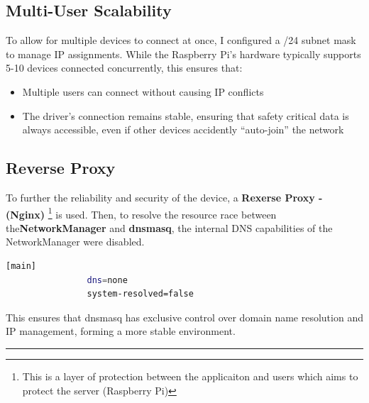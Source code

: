\subsection{Multi-User Scalability}
To allow for multiple devices to connect at once, I configured a /24 subnet mask to manage IP assignments. While the Raspberry Pi’s hardware
typically supports 5-10 devices connected concurrently, this ensures that:
\begin{itemize}
    \item Multiple users can connect without causing IP conflicts
    \item The driver’s connection remains stable, ensuring that safety critical data is always accessible, even if other devices accidently
    “auto-join” the network
\end{itemize}

\subsection{Reverse Proxy}
To further the reliability and security of the device, a \textbf{Rexerse Proxy - (Nginx)} \footnote{This is a layer of protection between the
applicaiton and users which aims to protect the server (Raspberry Pi)} is used.
Then, to resolve the resource race between the\textbf{NetworkManager} and \textbf{dnsmasq}, the internal DNS capabilities of the NetworkManager
were disabled.
\vspace{1em}
\begin{center} %
    \begin{minipage}{0.7\textwidth}
        \begin{mdframed}
            \begin{lstlisting}[language=bash, caption={NetworkManager.conf modifications for preventing inbuilt DNS}, captionpos=b]
                [main]
                dns=none
                system-resolved=false
            \end{lstlisting}
        \end{mdframed}
    \end{minipage}
\end{center}
\vspace{1em}

This ensures that dnsmasq has exclusive control over domain name resolution and IP management, forming a more stable environment.

\noindent\rule{\textwidth}{0.4pt}

